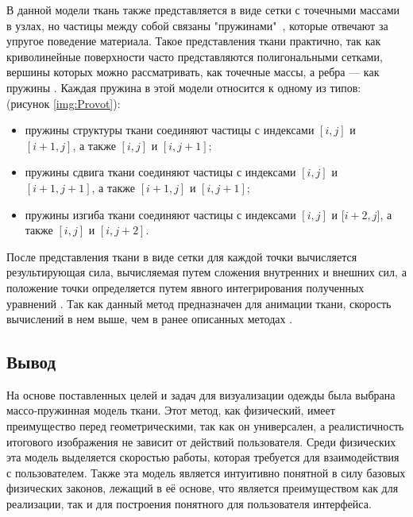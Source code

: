 \begin{itemize}[left=\parindent]
        В данной модели ткань также представляется в виде сетки с точечными
        массами в узлах, но частицы между собой связаны "пружинами"\ , которые
        отвечают за упругое поведение материала. Такое представления ткани
        практично, так как криволинейные поверхности часто представляются
        полигональными сетками, вершины которых можно рассматривать, как
        точечные массы, а ребра --- как пружины \cite{bib15}. Каждая пружина в
        этой модели относится к одному из типов: \cite{bib14} (рисунок
        \ref{img:Provot}):
        \begin{itemize}[left=\parindent]
            \item пружины структуры ткани соединяют частицы с индексами $[i,j]$
                и $[i+1,j]$, а также $[i,j]$ и $[i, j+1]$;
            \item пружины сдвига ткани соединяют частицы с индексами $[i,j]$ и
                $[i+1,j+1]$, а также $[i+1,j]$ и $[i, j+1]$;
            \item пружины изгиба ткани соединяют частицы с индексами $[i,j]$ и
                [$i+2,j]$, а также $[i,j]$ и $[i, j+2]$.
        \end{itemize}


        После представления ткани в виде сетки для каждой точки вычисляется
        результирующая сила, вычисляемая путем сложения внутренних и внешних
        сил, а положение точки определяется путем явного интегрирования
        полученных уравнений \cite{bib11}.  Так как данный метод предназначен
        для анимации ткани, скорость вычислений в нем выше, чем в ранее
        описанных методах \cite{bib14}.

\end{itemize}

\subsection*{Вывод}

На основе поставленных целей и задач для визуализации одежды была выбрана
массо-пружинная модель ткани. Этот метод, как физический, имеет преимущество
перед геометрическими, так как он универсален, а реалистичность итогового
изображения не зависит от действий пользователя. Среди физических эта модель
выделяется скоростью работы, которая требуется для взаимодействия с
пользователем. Также эта модель является интуитивно понятной в силу базовых
физических законов, лежащий в её основе, что является преимуществом как для
реализации, так и для построения понятного для пользователя интерфейса.

